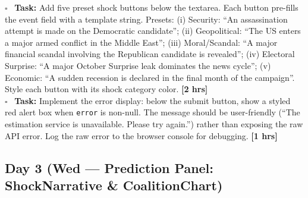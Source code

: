 \documentclass[11pt]{article}
\newcommand{\hrs}[1]{\textbf{[#1 hrs]}}
\newcommand{\dayhead}[2]{%
  \subsection*{Day #1 \normalfont\small\color{codegray}(#2)}}
\newcommand{\task}[2]{%
  \noindent\textbf{Task:} #1 \hfill \hrs{#2}\\}
\newcommand{\done}{\textcolor{sectionblue}{$\square$}\ }
\begin{document}
\begin{taskbox}
\done \task{Add five preset shock buttons below the textarea. Each button
  pre-fills the event field with a template string. Presets: (i) Security:
  ``An assassination attempt is made on the Democratic candidate''; (ii)
  Geopolitical: ``The US enters a major armed conflict in the Middle East'';
  (iii) Moral/Scandal: ``A major financial scandal involving the Republican
  candidate is revealed''; (iv) Electoral Surprise: ``A major October
  Surprise leak dominates the news cycle''; (v) Economic: ``A sudden
  recession is declared in the final month of the campaign''. Style each
  button with its shock category color.}{2}

\done \task{Implement the error display: below the submit button, show a
  styled red alert box when \texttt{error} is non-null. The message should
  be user-friendly (``The estimation service is unavailable. Please try again.'')
  rather than exposing the raw API error. Log the raw error to the browser
  console for debugging.}{1}
\end{taskbox}

\dayhead{3}{Wed --- Prediction Panel: ShockNarrative \& CoalitionChart}
\end{document}
